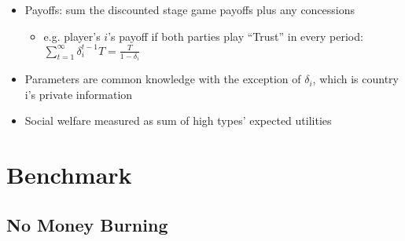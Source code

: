 \documentclass[handout]{beamer}
\newcommand{\de}{\delta}
\begin{document}

\begin{frame}
\begin{itemize}[<+->]
	\item Payoffs: sum the discounted stage game payoffs plus any concessions 
		\begin{itemize}
			\item e.g. player's $i$'s payoff if both parties play ``Trust'' in every period: $\sum_{t=1}^\infty \de_i^{t-1} T = \frac{T}{1-\de_i}$
		\end{itemize}
	\item Parameters are common knowledge with the exception of $\delta_i$, which is country i's private information
	\item Social welfare measured as sum of high types' expected utilities
\end{itemize}
\end{frame}


\section{Benchmark}
\subsection{No Money Burning}
\end{document}
